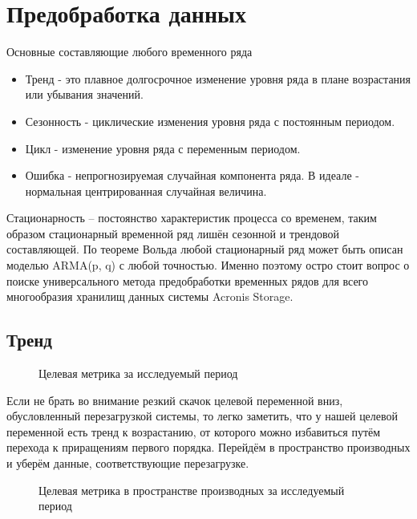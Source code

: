 \documentclass[14pt, a4paper]{extarticle}
\begin{document}
	\section{Предобработка данных}
		
	Основные составляющие любого временного ряда
	\begin{itemize}
	\item Тренд - это плавное долгосрочное изменение уровня ряда в плане возрастания или убывания значений. 
	\item Сезонность - циклические изменения уровня ряда с постоянным периодом.
	\item Цикл - изменение уровня ряда с переменным периодом. 
	\item Ошибка - непрогнозируемая случайная компонента ряда. В идеале - нормальная центрированная случайная величина.
	\end{itemize}
	
	Стационарность – постоянство характеристик процесса со временем, таким образом стационарный временной ряд лишён сезонной и трендовой составляющей. По теореме Вольда любой стационарный ряд может быть описан моделью ARMA(p, q) с любой точностью. Именно поэтому остро стоит вопрос о поиске универсального метода предобработки временных рядов для всего многообразия хранилищ данных системы Acronis Storage.
	\subsection{Тренд}
	\begin{figure}[H]
		\centerline{} 
		\caption{Целевая метрика за исследуемый период}
		\label{target_metric_fig1}
	\end{figure} 
	
	Если не брать во внимание резкий скачок целевой переменной вниз, обусловленный перезагрузкой системы, то легко заметить, что у нашей целевой переменной есть тренд к возрастанию, от которого можно избавиться путём перехода к приращениям первого порядка. Перейдём в пространство производных и уберём данные, соответствующие перезагрузке. 
	
	\begin{figure}[H]
		\centerline{} 
		\caption{Целевая метрика в пространстве производных за исследуемый \\ период}
		\label{target_metric_fig1}
	\end{figure} 	
	
\end{document}
